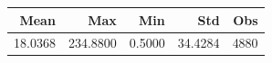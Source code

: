 \begin{tabular}{rrrrr}
\toprule
Mean & Max & Min & Std & Obs \\
\midrule
18.0368 & 234.8800 & 0.5000 & 34.4284 & 4880 \\
\bottomrule
\end{tabular}
